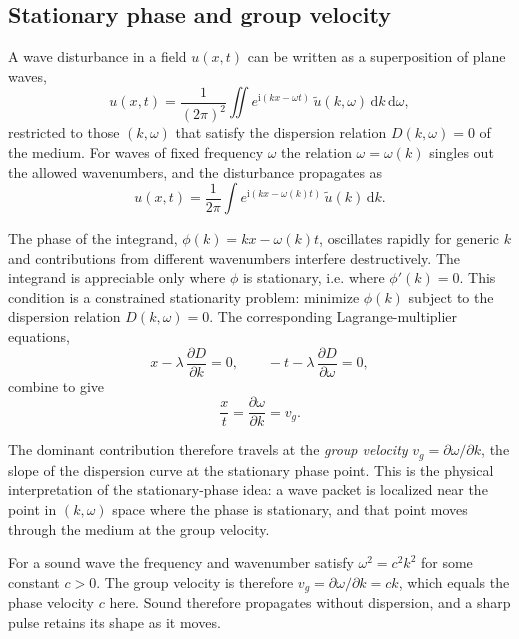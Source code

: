 \subsection{Stationary phase and group velocity}

A wave disturbance in a field $u(x,t)$ can be written as a superposition of plane waves,
\begin{equation}
u(x,t)=\frac{1}{(2\pi)^2}\iint e^{\mathrm{i}(kx-\omega t)}\,\widetilde u(k,\omega)\,\mathrm{d}k\,\mathrm{d}\omega,
\end{equation}
restricted to those $(k,\omega)$ that satisfy the dispersion relation $D(k,\omega)=0$ of the medium. For waves of fixed frequency $\omega$ the relation $\omega=\omega(k)$ singles out the allowed wavenumbers, and the disturbance propagates as
\begin{equation}
u(x,t)=\frac{1}{2\pi}\int e^{\mathrm{i}(kx-\omega(k)t)}\,\widetilde u(k)\,\mathrm{d}k.
\end{equation}

The phase of the integrand, $\phi(k)=kx-\omega(k)t$, oscillates rapidly for generic $k$ and contributions from different wavenumbers interfere destructively. The integrand is appreciable only where $\phi$ is stationary, i.e. where $\phi'(k)=0$. This condition is a constrained stationarity problem: minimize $\phi(k)$ subject to the dispersion relation $D(k,\omega)=0$. The corresponding Lagrange-multiplier equations,
\begin{equation}
x-\lambda\,\frac{\partial D}{\partial k}=0,
\qquad
-t-\lambda\,\frac{\partial D}{\partial \omega}=0,
\end{equation}
combine to give
\begin{equation}
\frac{x}{t}=\frac{\partial\omega}{\partial k}=v_g.
\end{equation}

The dominant contribution therefore travels at the \emph{group velocity} $v_g=\partial\omega/\partial k$, the slope of the dispersion curve at the stationary phase point. This is the physical interpretation of the stationary-phase idea: a wave packet is localized near the point in $(k,\omega)$ space where the phase is stationary, and that point moves through the medium at the group velocity.

\begin{example}
For a sound wave the frequency and wavenumber satisfy $\omega^2=c^2k^2$ for some constant $c>0$. The group velocity is therefore $v_g=\partial\omega/\partial k=ck$, which equals the phase velocity $c$ here. Sound therefore propagates without dispersion, and a sharp pulse retains its shape as it moves.
\end{example}

